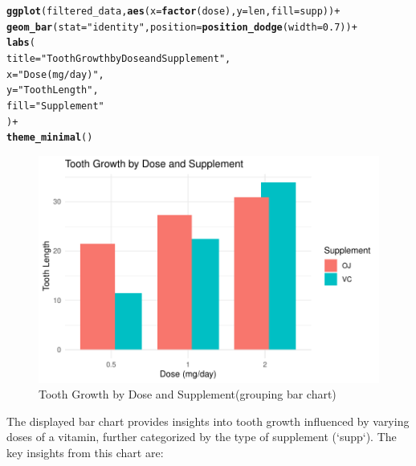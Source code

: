 \documentclass{article}\usepackage[]{graphicx}\usepackage[]{xcolor}
\makeatletter
\def\maxwidth{ %
  \ifdim\Gin@nat@width>\linewidth
    \linewidth
  \else
    \Gin@nat@width
  \fi
}
\newcommand{\hlnum}[1]{\textcolor[rgb]{0.686,0.059,0.569}{#1}}%
\newcommand{\hlstr}[1]{\textcolor[rgb]{0.192,0.494,0.8}{#1}}%
\newcommand{\hlopt}[1]{\textcolor[rgb]{0,0,0}{#1}}%
\newcommand{\hlstd}[1]{\textcolor[rgb]{0.345,0.345,0.345}{#1}}%
\newcommand{\hlkwc}[1]{\textcolor[rgb]{0.333,0.667,0.333}{#1}}%
\newcommand{\hlkwd}[1]{\textcolor[rgb]{0.737,0.353,0.396}{\textbf{#1}}}%
\newenvironment{kframe}{%
 \def\at@end@of@kframe{}%
 \ifinner\ifhmode%
  \def\at@end@of@kframe{\end{minipage}}%
  \begin{minipage}{\columnwidth}%
 \fi\fi%
 \def\FrameCommand##1{\hskip\@totalleftmargin \hskip-\fboxsep
 \colorbox{shadecolor}{##1}\hskip-\fboxsep
     \hskip-\linewidth \hskip-\@totalleftmargin \hskip\columnwidth}%
 \MakeFramed {\advance\hsize-\width
   \@totalleftmargin\z@ \linewidth\hsize
   \@setminipage}}%
 {\par\unskip\endMakeFramed%
 \at@end@of@kframe}
\newenvironment{knitrout}{}{} %
\makeatother
\begin{document}
\begin{knitrout}
\color{fgcolor}\begin{kframe}
\begin{alltt}
\hlkwd{ggplot}\hlstd{(filtered_data,} \hlkwd{aes}\hlstd{(}\hlkwc{x} \hlstd{=} \hlkwd{factor}\hlstd{(dose),} \hlkwc{y} \hlstd{= len,} \hlkwc{fill} \hlstd{= supp))} \hlopt{+}
  \hlkwd{geom_bar}\hlstd{(}\hlkwc{stat} \hlstd{=} \hlstr{"identity"}\hlstd{,} \hlkwc{position} \hlstd{=} \hlkwd{position_dodge}\hlstd{(}\hlkwc{width} \hlstd{=} \hlnum{0.7}\hlstd{))} \hlopt{+}
  \hlkwd{labs}\hlstd{(}
    \hlkwc{title} \hlstd{=} \hlstr{"Tooth Growth by Dose and Supplement"}\hlstd{,}
    \hlkwc{x} \hlstd{=} \hlstr{"Dose (mg/day)"}\hlstd{,}
    \hlkwc{y} \hlstd{=} \hlstr{"Tooth Length"}\hlstd{,}
    \hlkwc{fill} \hlstd{=} \hlstr{"Supplement"}
  \hlstd{)} \hlopt{+}
  \hlkwd{theme_minimal}\hlstd{()}
\end{alltt}
\end{kframe}\begin{figure}
\includegraphics[width=\maxwidth]{figure/barchart2-1} \caption[Tooth Growth by Dose and Supplement(grouping bar chart)]{Tooth Growth by Dose and Supplement(grouping bar chart)}\label{fig:barchart2}
\end{figure}

\end{knitrout}
The displayed bar chart provides insights into tooth growth influenced by varying doses of a vitamin, further categorized by the type of supplement (`supp`). The key insights from this chart are:
\end{document}
